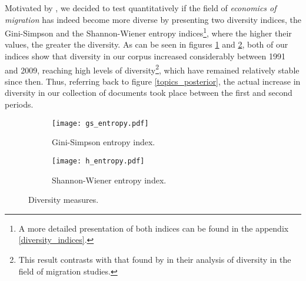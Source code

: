 Motivated by \cite{pisarevskaya_mapping_2020}, we decided to test quantitatively if the field of \textit{economics of migration} has indeed become more diverse by presenting two diversity indices, the Gini-Simpson and the Shannon-Wiener entropy indices\footnote{A more detailed presentation of both indices can be found in the appendix \ref{diversity_indices}.}, where the higher their values, the greater the diversity. As can be seen in figures \ref{fig:gini_simpson_entropy} and \ref{fig:shannon_wiener_entropy}, both of our indices show that diversity in our corpus increased considerably between 1991 and 2009, reaching high levels of diversity\footnote{This result contrasts with that found by \cite[p. 467]{pisarevskaya_mapping_2020} in their analysis of diversity in the field of migration studies.}, which have remained relatively stable since then. Thus, referring back to figure \ref{topics_posterior}, the actual increase in diversity in our collection of documents took place between the first and second periods.

\begin{figure}[ht!]
	\centering
	\begin{subfigure}{0.49\textwidth}
		\centering
		\texttt{[image: gs\_entropy.pdf]}
		\caption{Gini-Simpson entropy index.}
		\label{fig:gini_simpson_entropy}
	\end{subfigure}
	\hfill
	\begin{subfigure}{0.49\textwidth}
		\centering
		\texttt{[image: h\_entropy.pdf]}
		\caption{Shannon-Wiener entropy index.}
		\label{fig:shannon_wiener_entropy}
	\end{subfigure}
\caption{Diversity measures.}
\label{fig:diversity_indices}
\end{figure}